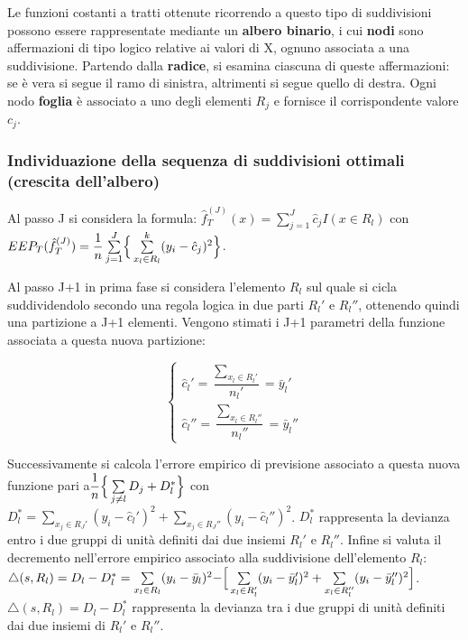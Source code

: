 \documentclass[a4paper]{extarticle}
\begin{document}
Le funzioni costanti a tratti ottenute ricorrendo a questo tipo di suddivisioni possono essere rappresentate mediante un \textbf{albero binario}, i cui \textbf{nodi} sono affermazioni di tipo logico relative ai valori di X, ognuno associata a una suddivisione. Partendo dalla \textbf{radice}, si esamina ciascuna di queste affermazioni: se è vera si segue il ramo di sinistra, altrimenti si segue quello di destra. Ogni nodo \textbf{foglia} è associato a uno degli elementi $R_j$ e fornisce il corrispondente valore $c_j$.

\subsubsection{Individuazione della sequenza di suddivisioni ottimali (crescita dell'albero)}

Al passo J si considera la formula: $\hat f_T^{(J)}(x) = \sum\limits_{j=1}^J \hat c_j I(x \in R_l)$ con $EEP_T(\hat f_T^{(J)})= \dfrac{1}{n}\sum\limits_{j=1}^J \Bigr \{\sum\limits_{x_l \in R_l}^k (y_i - \hat c_j)^2 \Bigl \} $. 

Al passo J+1 in prima fase si considera l'elemento $R_l$ sul quale si cicla suddividendolo secondo una regola logica in due parti $R_l'$ e $R_l ''$, ottenendo quindi una partizione a J+1 elementi. Vengono stimati i J+1 parametri della funzione associata a questa nuova partizione:

\begin{equation*}
\begin{cases}
		\hat c_l' = \dfrac{\sum\limits_{x_l \in R_l'}}{n_l'} = \bar y_l ' \\
		\hat c_l'' = \dfrac{\sum\limits_{x_l \in R_l''}}{n_l''} = \bar y_l '' 
	\end{cases}
\end{equation*}

Successivamente si calcola l'errore empirico di previsione associato a questa nuova funzione pari a$\dfrac{1}{n} \Bigr \{ \sum\limits_{j \not = l} D_j + D_l^* \Bigl \}$ con $D_l^* = \sum\limits_{x_j \in R_J'}(y_i - \hat c_l')^2 + \sum\limits_{x_j \in R_J''}(y_i - \hat c_l'')^2$. $D_l^*$ rappresenta la devianza entro i due gruppi di unità definiti dai due insiemi $R_l'$ e $R_l''$. Infine si valuta il decremento nell'errore empirico associato alla suddivisione dell'elemento $R_l$: $\triangle (s, R_l) = D_l - D_l^* = \sum\limits_{x_l \in R_l} (y_i- \bar y_l)^2 - \Bigr [ \sum\limits_{x_l \in R_l'} (y_i - \bar y_l')^2 + \sum\limits_{x_l \in R_l''} (y_i - \bar y_l'')^2 \Bigl ]$. $\triangle (s,R_l) = D_l -D_l^*$ rappresenta la devianza tra i due gruppi di unità definiti dai due insiemi di $R_l'$ e $R_l''$. 
\end{document}
